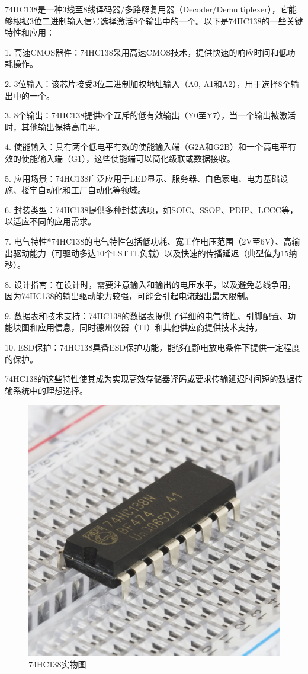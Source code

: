 \documentclass{textreportclass}  %
\begin{document}
	74HC138是一种3线至8线译码器/多路解复用器（Decoder/Demultiplexer），它能够根据3位二进制输入信号选择激活8个输出中的一个。以下是74HC138的一些关键特性和应用：
	
	1. 高速CMOS器件：74HC138采用高速CMOS技术，提供快速的响应时间和低功耗操作。
	
	2. 3位输入：该芯片接受3位二进制加权地址输入（A0, A1和A2），用于选择8个输出中的一个。
	
	3. 8个输出：74HC138提供8个互斥的低有效输出（Y0至Y7），当一个输出被激活时，其他输出保持高电平。
	
	4. 使能输入：具有两个低电平有效的使能输入端（G2A和G2B）和一个高电平有效的使能输入端（G1），这些使能端可以简化级联或数据接收。
	
	5. 应用场景：74HC138广泛应用于LED显示、服务器、白色家电、电力基础设施、楼宇自动化和工厂自动化等领域。
	
	6. 封装类型：74HC138提供多种封装选项，如SOIC、SSOP、PDIP、LCCC等，以适应不同的应用需求。
	
	7. 电气特性*74HC138的电气特性包括低功耗、宽工作电压范围（2V至6V）、高输出驱动能力（可驱动多达10个LSTTL负载）以及快速的传播延迟（典型值为15纳秒）。
	
	8. 设计指南：在设计时，需要注意输入和输出的电压水平，以及避免总线争用，因为74HC138的输出驱动能力较强，可能会引起电流超出最大限制。
	
	9. 数据表和技术支持：74HC138的数据表提供了详细的电气特性、引脚配置、功能块图和应用信息，同时德州仪器（TI）和其他供应商提供技术支持。
	
	10. ESD保护：74HC138具备ESD保护功能，能够在静电放电条件下提供一定程度的保护。
	
	74HC138的这些特性使其成为实现高效存储器译码或要求传输延迟时间短的数据传输系统中的理想选择。
	
	\begin{figure}[htbp]
		\centering
		\includegraphics[scale=0.2]{Fig/74HC138(3).jpg}
		\caption{74HC138实物图}\label{Fig.15}
	\end{figure}
	
\end{document}
